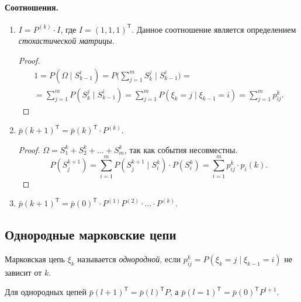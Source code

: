 \paragraph{Соотношения.}
\begin{enumerate}
  \item $I = P^{(k)} \cdot I$, где $I = \left( 1 , 1 , 1 \right)^{\mathsf T} $. 
    Данное соотношение является определением \emph{стохастической матрицы}.
    \begin{proof}
      \begin{multline*}
        1 = P(\Omega \mid S_{k-1}^i) = P\biggl(\sum_{j=1}^m S_k^j \mid
          S_{k-1}^i\biggl)
        = \\ =
        \sum_{j=1}^m P(S_k^j \mid S_{k-1}^i)
        = \sum_{j=1}^m P\left(\xi_k = j \mid \xi_{k-1}=i\right) = \sum_{j=1}^m p_{ij}^k.
      \end{multline*}
    \end{proof}

  \item $\bar{p} (k+1) ^{\mathsf T} = \bar{p}(k)^{\mathsf T} \cdot P^{(k)}$.
    \begin{proof}
      $\Omega = S_1^k + S_2^k + \ldots + S_m^k$, так как события несовместны.
    \[
      P(S_j^{k+1}) = \sum_{i=1}^m P(S_j^{k+1} \mid S_i^k) \cdot P(S_i^k)
      = \sum_{i=1}^m p_{ij}^k \cdot p_i(k).
    \]
    \end{proof}

  \item $\bar{p} (k+1)^{\mathsf T} = \bar{p}(0)^{\mathsf T} \cdot P^{(1)} P^{(2)} \cdot \ldots \cdot P^{(k)}$.
\end{enumerate}


\subsection{Однородные марковские цепи}
\begin{definition}
  Марковская цепь $\xi_k$ называется \emph{однородной}, если $p_{ij}^k =
  P(\xi_k=j \mid \xi_{k-1}=i)$ не
  зависит от $ k $.
\end{definition}
Для однородных цепей $\bar{p}(l+1)^{\mathsf T} = \bar{p}(l)^{\mathsf T} P$, а
$\bar{p}(l=1)^{\mathsf T} = \bar{p}(0)^{\mathsf T} P^{l+1}$.

